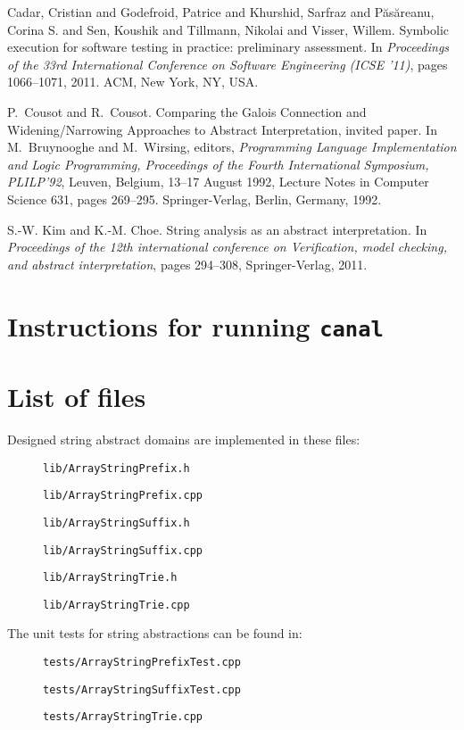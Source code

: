 \documentclass[12pt,final,oneside]{fithesis2}
\theoremstyle{definition}
\begin{document}
\begin{thebibliography}{99}
Cadar, Cristian and Godefroid, Patrice and Khurshid, Sarfraz and
  P\u{a}s\u{a}reanu, Corina S. and Sen, Koushik and Tillmann, Nikolai and
  Visser, Willem.
\newblock Symbolic execution for software testing in practice: preliminary
  assessment.
\newblock In \emph{Proceedings of the 33rd International Conference on
  Software Engineering (ICSE '11)}, pages 1066--1071, 2011. ACM, New York,
  NY, USA.

P.~Cousot and R.~Cousot.
\newblock Comparing the {G}alois Connection and Widening/Narrowing
  Approaches to Abstract Interpretation, invited paper.
\newblock In M.~Bruynooghe and M.~Wirsing, editors, \emph{Programming
  Language Implementation and Logic Programming, Proceedings of the
  Fourth International Symposium, PLILP'92}, Leuven, Belgium, 13--17
  August 1992, Lecture Notes in Computer Science 631, pages 269--295.
  Springer-Verlag, Berlin, Germany, 1992.

S.-W. Kim and K.-M. Choe.
\newblock String analysis as an abstract interpretation.
\newblock In \emph{Proceedings of the 12th international conference on
  Verification, model checking, and abstract interpretation}, pages 294--308,
  Springer-Verlag, 2011.

\end{thebibliography}


\appendix

\chapter{Instructions for running \texttt{canal}}
\label{chap:instructions}




\chapter{List of files}

Designed string abstract domains are implemented in these files:

\begin{description}
\item[] \texttt{lib/ArrayStringPrefix.h}
\item[] \texttt{lib/ArrayStringPrefix.cpp}
\item[] \texttt{lib/ArrayStringSuffix.h}
\item[] \texttt{lib/ArrayStringSuffix.cpp}
\item[] \texttt{lib/ArrayStringTrie.h}
\item[] \texttt{lib/ArrayStringTrie.cpp}
\end{description}

The unit tests for string abstractions can be found in:

\begin{description}
\item[] \texttt{tests/ArrayStringPrefixTest.cpp}
\item[] \texttt{tests/ArrayStringSuffixTest.cpp}
\item[] \texttt{tests/ArrayStringTrie.cpp}
\end{description}


\end{document}
